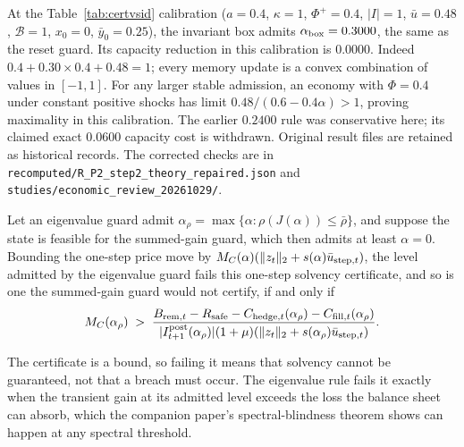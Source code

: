 At the Table~\ref{tab:certvsid} calibration ($a=0.4$, $\kappa=1$, $\Phi^+=0.4$, $|I|=1$, $\bar u=0.48$, $\mathcal B=1$, $x_0=0$, $\bar y_0=0.25$), the invariant box admits $\alpha_{\rm box}=0.3000$, the same as the reset guard. Its capacity reduction in this calibration is $0.0000$. Indeed $0.4+0.30\times0.4+0.48=1$; every memory update is a convex combination of values in $[-1,1]$. For any larger stable admission, an economy with $\Phi=0.4$ under constant positive shocks has limit $0.48/(0.6-0.4\alpha)>1$, proving maximality in this calibration. The earlier $0.2400$ rule was conservative here; its claimed exact $0.0600$ capacity cost is withdrawn. Original result files are retained as historical records. The corrected checks are in \texttt{recomputed/R\_P2\_step2\_theory\_repaired.json} and \texttt{studies/economic\_review\_20261029/}.

\begin{proposition}\label{prop:dominance}
Let an eigenvalue guard admit $\alpha_\rho=\max\{\alpha:\rho(J(\alpha))\le\bar\rho\}$, and suppose the state is feasible for the summed-gain guard, which then admits at least $\alpha=0$. Bounding the one-step price move by $M_C(\alpha)(\|z_t\|_2+s(\alpha)\bar u_{{\rm step},t})$, the level admitted by the eigenvalue guard fails this one-step solvency certificate, and so is one the summed-gain guard would not certify, if and only if
\[
M_C(\alpha_\rho)\;>\;\frac{B_{{\rm rem},t}-R_{\rm safe}-C_{{\rm hedge},t}(\alpha_\rho)-C_{{\rm fill},t}(\alpha_\rho)}{|I^{\rm post}_{t+1}(\alpha_\rho)|(1+\mu)(\|z_t\|_2+s(\alpha_\rho)\bar u_{{\rm step},t})} .
\]
\end{proposition}

The certificate is a bound, so failing it means that solvency cannot be guaranteed, not that a breach must occur. The eigenvalue rule fails it exactly when the transient gain at its admitted level exceeds the loss the balance sheet can absorb, which the companion paper's spectral-blindness theorem shows can happen at any spectral threshold.

